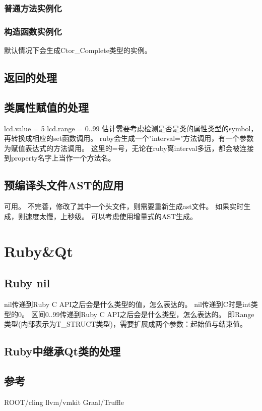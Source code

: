 \subsection{普通方法实例化}
\subsection{构造函数实例化}
默认情况下会生成Ctor\_Complete类型的实例。

\section{返回的处理}

\section{类属性赋值的处理}
lcd.value = 5
lcd.range = 0..99
估计需要考虑检测是否是类的属性类型的symbol，再转换成相应的set函数调用。
ruby会生成一个"interval="方法调用，有一个参数为赋值表达式的方法调用。
这里的=号，无论在ruby离interval多远，都会被连接到property名字上当作一个方法名。

\section{预编译头文件AST的应用}
可用。
不完善，修改了其中一个头文件，则需要重新生成ast文件。
如果实时生成，则速度太慢，上秒级。
可以考虑使用增量式的AST生成。

\chapter{Ruby&Qt}
\section{Ruby nil}
nil传递到Ruby C API之后会是什么类型的值，怎么表达的。
nil传递到C时是int类型的0。
区间0..99传递到Ruby C API之后会是什么类型，怎么表达的。
即Range类型(内部表示为T\_STRUCT类型)，需要扩展成两个参数：起始值与结束值。

\section{Ruby中继承Qt类的处理}


\section{参考}
ROOT/cling
llvm/vmkit
Graal/Truffle

